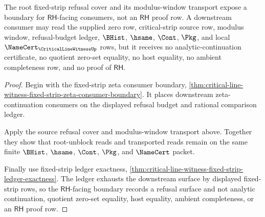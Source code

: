 \begin{theorem}
\label{thm:critical-line-witness-rh-boundary-nonclaim}
The root fixed-strip refusal cover and its modulus-window transport expose a boundary for $\mathsf{RH}$-facing consumers, not an $\mathsf{RH}$ proof row. A downstream consumer may read the supplied zero row, critical-strip source row, modulus window, refusal-budget ledger, $\BHist$, $\hsame$, $\Cont$, $\Pkg$, and local $\NameCert_{\CriticalLineWitnessUp}$ rows, but it receives no analytic-continuation certificate, no quotient zero-set equality, no host equality, no ambient completeness row, and no proof of $\mathsf{RH}$.
\end{theorem}
\begin{proof}
Begin with the fixed-strip zeta consumer boundary, \autoref{thm:critical-line-witness-fixed-strip-zeta-consumer-boundary}. It places downstream zeta-continuation consumers on the displayed refusal budget and rational comparison ledger.

Apply the source refusal cover and modulus-window transport above. Together they show that root-unblock reads and transported reads remain on the same finite $\BHist$, $\hsame$, $\Cont$, $\Pkg$, and $\NameCert$ packet.

Finally use fixed-strip ledger exactness, \autoref{thm:critical-line-witness-fixed-strip-ledger-exactness}. The ledger exhausts the downstream surface by displayed fixed-strip rows, so the $\mathsf{RH}$-facing boundary records a refusal surface and not analytic continuation, quotient zero-set equality, host equality, ambient completeness, or an $\mathsf{RH}$ proof row.
\end{proof}

